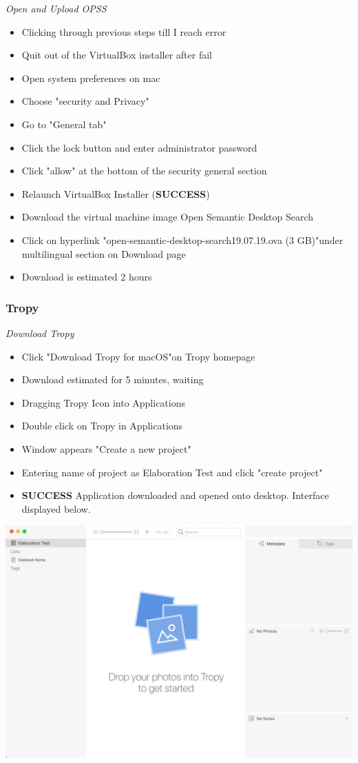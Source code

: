 \documentclass{article}
\begin{document}
\textit{Open and Upload OPSS}
\begin{itemize}
\item Clicking through previous steps till I reach error
\item Quit out of the VirtualBox installer after fail
\item Open system preferences on mac
\item Choose "security and Privacy" 
\item Go to "General tab"
\item Click the lock button and enter administrator password
\item Click "allow" at the bottom of the security general section
\item Relaunch VirtualBox Installer (\textbf{SUCCESS})
\item Download the virtual machine image Open Semantic Desktop Search
\item Click on hyperlink "open-semantic-desktop-search19.07.19.ova (3 GB)"under multilingual section on Download page
\item Download is estimated 2 hours
\end{itemize}

\subsubsection{Tropy}
\textit{Download Tropy}
\begin{itemize}
\item Click "Download Tropy for macOS"on Tropy homepage
\item Download estimated for 5 minutes, waiting
\item Dragging Tropy Icon into Applications
\item Double click on Tropy in Applications
\item Window appears "Create a new project"
\item Entering name of project as Elaboration Test and click "create project"
\item \textbf{SUCCESS} Application downloaded and opened onto desktop. Interface displayed below.
\end{itemize}

\includegraphics[width=\textwidth]{Images/TropyInterface.png}\\
\end{document}
